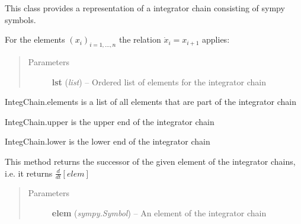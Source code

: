 \documentclass[letterpaper,10pt,english]{sphinxmanual}
\begin{document}
\begin{fulllineitems}
\label{pytrajectory:pytrajectory.utilities.IntegChain}
This class provides a representation of a integrator chain consisting of sympy symbols.

For the elements \((x_i)_{i=1,...,n}\) the relation
\(\dot{x}_i = x_{i+1}\) applies:
\begin{quote}\begin{description}
\item[{Parameters}] \leavevmode
\textbf{lst} (\emph{list}) -- Ordered list of elements for the integrator chain

\end{description}\end{quote}

\begin{fulllineitems}
\label{pytrajectory:pytrajectory.utilities.IntegChain.elements}
IntegChain.elements is a list of all elements that are part of the integrator chain

\end{fulllineitems}


\begin{fulllineitems}
\label{pytrajectory:pytrajectory.utilities.IntegChain.upper}
IntegChain.upper is the upper end of the integrator chain

\end{fulllineitems}


\begin{fulllineitems}
\label{pytrajectory:pytrajectory.utilities.IntegChain.lower}
IntegChain.lower is the lower end of the integrator chain

\end{fulllineitems}


\begin{fulllineitems}
\label{pytrajectory:pytrajectory.utilities.IntegChain.succ}
This method returns the successor of the given element of the
integrator chains, i.e. it returns \(\frac{d}{dt}[elem]\)
\begin{quote}\begin{description}
\item[{Parameters}] \leavevmode
\textbf{elem} (\emph{sympy.Symbol}) -- An element of the integrator chain


\end{description}
\end{quote}
\end{fulllineitems}
\end{fulllineitems}
\end{document}
